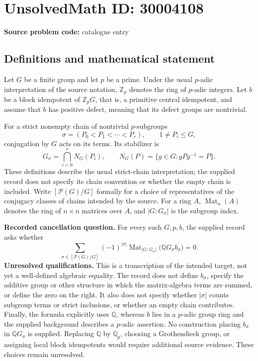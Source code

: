 \documentclass[11pt]{article}
\newcommand{\Z}{\mathbb{Z}}
\newcommand{\Q}{\mathbb{Q}}
\begin{document}
\section*{UnsolvedMath ID: 30004108}
\textbf{Source problem code:} catalogue entry
\subsection{Definitions and mathematical statement}
Let \(G\) be a finite group and let \(p\) be a prime. Under the usual \(p\)-adic interpretation of the source notation, \(\Z_p\) denotes the ring of \(p\)-adic integers. Let \(b\) be a block idempotent of \(\Z_pG\), that is, a primitive central idempotent, and assume that \(b\) has positive defect, meaning that its defect groups are nontrivial.

For a strict nonempty chain of nontrivial \(p\)-subgroups
\[
\sigma=(P_0<P_1<\cdots<P_r),\qquad 1\ne P_i\le G,
\]
conjugation by \(G\) acts on its terms. Its stabilizer is
\[
G_\sigma=\bigcap_{i=0}^{r}N_G(P_i),\qquad
N_G(P)=\{g\in G:gPg^{-1}=P\}.
\]
These definitions describe the usual strict-chain interpretation; the supplied record does not specify its chain convention or whether the empty chain is included. Write \([\mathcal P(G)/G]\) formally for a choice of representatives of the conjugacy classes of chains intended by the source. For a ring \(A\), \(\operatorname{Mat}_n(A)\) denotes the ring of \(n\times n\) matrices over \(A\), and \(|G:G_\sigma|\) is the subgroup index.

\textbf{Recorded cancellation question.} For every such \(G,p,b\), the supplied record asks whether
\[
\sum_{\sigma\in[\mathcal P(G)/G]}
(-1)^{|\sigma|}
\operatorname{Mat}_{|G:G_\sigma|}
\bigl(\Q G_\sigma b_\sigma\bigr)=0.
\]
\textbf{Unresolved qualifications.} This is a transcription of the intended target, not yet a well-defined algebraic equality. The record does not define \(b_\sigma\), specify the additive group or other structure in which the matrix-algebra terms are summed, or define the zero on the right. It also does not specify whether \(|\sigma|\) counts subgroup terms or strict inclusions, or whether an empty chain contributes. Finally, the formula explicitly uses \(\Q\), whereas \(b\) lies in a \(p\)-adic group ring and the supplied background describes a \(p\)-adic assertion. No construction placing \(b_\sigma\) in \(\Q G_\sigma\) is supplied. Replacing \(\Q\) by \(\Q_p\), choosing a Grothendieck group, or assigning local block idempotents would require additional source evidence. These choices remain unresolved.
\end{document}
